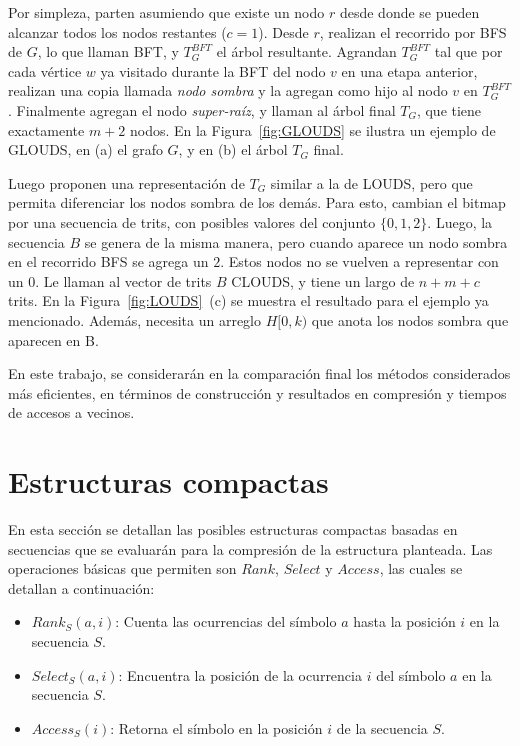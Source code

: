 Por simpleza, parten asumiendo que existe un nodo $r$ desde donde se pueden alcanzar todos los nodos restantes ($c = 1$). Desde $r$, realizan el recorrido por BFS de $G$, lo que llaman BFT, y $T_{G}^{BFT}$ el árbol resultante. Agrandan $T_{G}^{BFT}$ tal que por cada vértice $w$ ya visitado durante la BFT del nodo $v$ en una etapa anterior, realizan una copia llamada \textit{nodo sombra} y la agregan como hijo al nodo $v$ en $T_{G}^{BFT}$. Finalmente agregan el nodo \textit{super-raíz}, y llaman al árbol final $T_{G}$, que tiene exactamente $m + 2$ nodos. En la Figura~\ref{fig:GLOUDS} se ilustra un ejemplo de GLOUDS, en (a) el grafo $G$, y en (b) el árbol $T_{G}$ final.



Luego proponen una representación de $T_{G}$ similar a la de LOUDS, pero que permita diferenciar los nodos sombra de los demás. Para esto, cambian el bitmap por una secuencia de trits, con posibles valores del conjunto $\{0, 1, 2\}$. Luego, la secuencia $B$ se genera de la misma manera, pero cuando aparece un nodo sombra en el recorrido BFS se agrega un $2$. Estos nodos no se vuelven a representar con un $0$. Le llaman al vector de trits $B$ CLOUDS, y tiene un largo de $n + m + c$ trits. En la Figura~\ref{fig:LOUDS}~(c) se muestra el resultado para el ejemplo ya mencionado. Además, necesita un arreglo $H[0, k)$ que anota los nodos sombra que aparecen en B.


En este trabajo, se considerarán en la comparación final los métodos considerados más eficientes, en términos de construcción y resultados en compresión y tiempos de accesos a vecinos.



\section{Estructuras compactas} \label{sec:compactEstruct}
En esta sección se detallan las posibles estructuras compactas basadas en secuencias que se evaluarán para la compresión de la estructura planteada. Las operaciones básicas que permiten son \textbf{$Rank$}, \textbf{$Select$} y \textbf{$Access$}, las cuales se detallan a continuación:

\begin{itemize}
	\item \textbf{$Rank_{S}(a, i)$}: Cuenta las ocurrencias del símbolo $a$ hasta la posición $i$ en la secuencia $S$.
	\item \textbf{$Select_{S}(a, i)$}: Encuentra la posición de la ocurrencia $i$ del símbolo $a$ en la secuencia $S$.
	\item \textbf{$Access_{S}(i)$}: Retorna el símbolo en la posición $i$ de la secuencia $S$.
\end{itemize}

